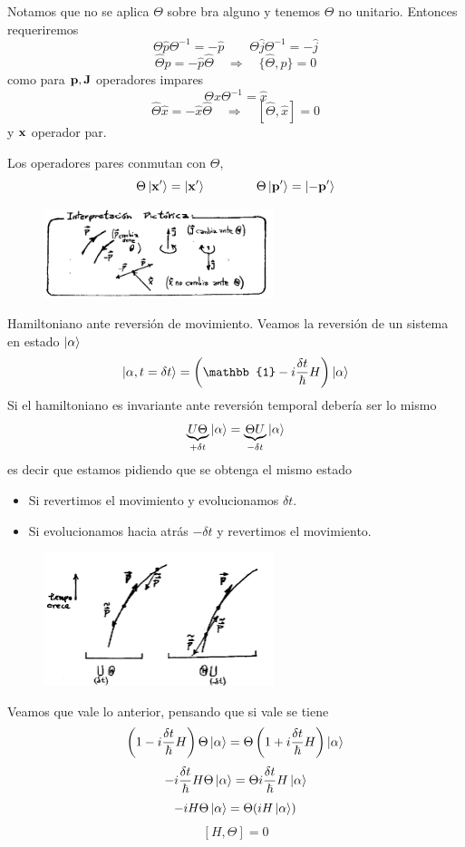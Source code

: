 \documentclass[10pt,oneside]{CBFT_book}
\begin{document}
Notamos que no se aplica $\Theta$ sobre bra alguno y tenemos $\Theta$ no unitario. Entonces requeriremos 
\[
	\Theta \hat{p} \Theta^{-1} = -\hat{p} \qquad \Theta \hat{j} \Theta^{-1} = -\hat{j}
\]
\[
	\hat{\Theta}\hat{p} = -\hat{p}\hat{\Theta} \quad \Rightarrow 
	\quad \{ \hat{\Theta},\hat{p}\} = 0
\]
como para $\vb{p},\vb{J}$ operadores impares 
\[
	\Theta \hat{x} \Theta^{-1} = \hat{x}
\]
\[
	\hat{\Theta}\hat{x} = -\hat{x}\hat{\Theta} \quad \Rightarrow 
	\quad [ \hat{\Theta},\hat{x} ] = 0
\]
y $\vb{x}$ operador par.

Los operadores pares conmutan con $\Theta$,
\[
	\Theta \Ket{\vb{x}'} =  \Ket{\vb{x}'} \qquad \qquad
	\Theta \Ket{\vb{p}'} =  \Ket{-\vb{p}'} 
\]
\begin{figure}[htb]
	\begin{center}
	\includegraphics[width=0.6\textwidth]{images/teo2_18.pdf}
	\end{center}
	\caption{}
\end{figure} 

Hamiltoniano ante reversión de movimiento. Veamos la reversión de un sistema en estado $\Ket{\alpha}$
\[
	\Ket{\alpha, t=\delta t} = \left( \mathbb{1} - i\frac{\delta t}{\hbar} H \right) \Ket{\alpha}
\]
Si el hamiltoniano es invariante ante reversión temporal debería ser lo mismo 
\[
	\underbrace{U \Theta}_{+\delta t} \Ket{\alpha} = \underbrace{\Theta U}_{-\delta t} \Ket{\alpha}
\]
es decir que estamos pidiendo que se obtenga el mismo estado 
\begin{itemize}
 \item Si revertimos el movimiento y evolucionamos $\delta t$.
 \item Si evolucionamos hacia atrás $-\delta t$ y revertimos el movimiento.
\end{itemize}
\begin{figure}[htb]
	\begin{center}
	\includegraphics[width=0.6\textwidth]{images/teo2_19.pdf}
	\end{center}
	\caption{}
\end{figure} 
Veamos que vale lo anterior, pensando que si vale se tiene 
\[
	\left( 1- i\frac{\delta t}{\hbar} H\right) \Theta \Ket{\alpha} =
	\Theta \left( 1 + i\frac{\delta t}{\hbar} H \right) \Ket{\alpha}
\]
\[
	- i\frac{\delta t}{\hbar} H \Theta \Ket{\alpha} =  \Theta
	i\frac{\delta t}{\hbar} H \Ket{\alpha} 
\]
\[
	- i H\Theta \Ket{\alpha} = \Theta (i H \Ket{\alpha} )
\]
\[
	[H,\Theta] = 0
\]
\end{document}
